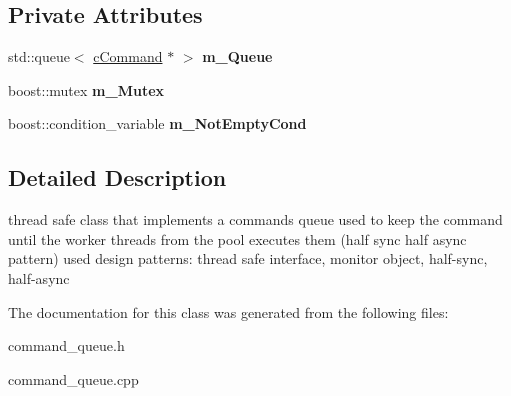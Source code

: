 \subsection*{\-Private \-Attributes}
\begin{DoxyCompactItemize}
\item 
\hypertarget{classengine_1_1cCommandQueue_acab17ed41f5114d5baaf14a6f8641e96}{std\-::queue$<$ \hyperlink{classengine_1_1cCommand}{c\-Command} $\ast$ $>$ {\bfseries m\-\_\-\-Queue}}\label{classengine_1_1cCommandQueue_acab17ed41f5114d5baaf14a6f8641e96}

\item 
\hypertarget{classengine_1_1cCommandQueue_a3382d012fe90188199630bef438d7901}{boost\-::mutex {\bfseries m\-\_\-\-Mutex}}\label{classengine_1_1cCommandQueue_a3382d012fe90188199630bef438d7901}

\item 
\hypertarget{classengine_1_1cCommandQueue_a7edc3ed909364aca4956ff6b8d95b912}{boost\-::condition\-\_\-variable {\bfseries m\-\_\-\-Not\-Empty\-Cond}}\label{classengine_1_1cCommandQueue_a7edc3ed909364aca4956ff6b8d95b912}

\end{DoxyCompactItemize}


\subsection{\-Detailed \-Description}
thread safe class that implements a commands queue used to keep the command until the worker threads from the pool executes them (half sync half async pattern) used design patterns\-: thread safe interface, monitor object, half-\/sync, half-\/async 

\-The documentation for this class was generated from the following files\-:\begin{DoxyCompactItemize}
\item 
command\-\_\-queue.\-h\item 
command\-\_\-queue.\-cpp\end{DoxyCompactItemize}
